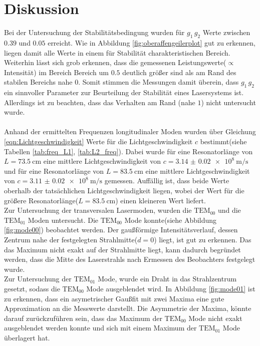 \section{Diskussion}
\label{sec:Diskussion}

Bei der Untersuchung der Stabilitätsbedingung wurden für $g_{1} \, g_{2}$
Werte zwischen $0.39$ und $0.05$ erreicht.
Wie in Abbildung \ref{fig:oberaffengeilerplot} gut zu erkennen, liegen damit alle Werte
in einem für Stabilität charakteristischen Bereich.
Weiterhin lässt sich grob erkennen, dass die gemessenen Leistungswerte($\propto$Intensität)
im Bereich Bereich um $0.5$ deutlich größer sind als am Rand des stabilen Bereichs nahe $0$.
Somit stimmen die Messungen damit überein, dass $g_{1} \, g_{2}$ ein sinnvoller Parameter zur
Beurteilung der Stabilität eines Lasersystems ist. Allerdings ist zu beachten, dass das Verhalten am
Rand (nahe $1$) nicht untersucht wurde.\\ \\


Anhand der ermittelten Frequenzen longitudinaler Moden wurden über Gleichung \eqref{eqn:Lichtgeschwindigkeit}
Werte für die Lichtgeschwindigkeit $c$ bestimmt(siehe Tabellen \ref{tab:freq_L1}, \ref{tab:L2_freq}).
Dabei wurde für eine Resonatorlänge von $L = \SI{73.5}{\centi\meter}$ eine mittlere
Lichtgeschwindigkeit von $ c = \SI{3.14(2) e8}{\meter\per\second}$
und für eine Resonatorlänge von $L = \SI{83.5}{\centi\meter}$ eine mittlere
Lichtgeschwindigkeit von $ c = \SI{3.11(2) e8}{\meter\per\second}$ gemessen.
Auffällig ist, dass beide Werte oberhalb der tatsächlichen Lichtgeschwindigkeit
liegen, wobei der Wert für die größere Resonatorlänge($L = \SI{83.5}{\centi\meter}$)
einen kleineren Wert liefert.\\
Zur Untersuchung der transversalen Lasermoden, wurden die \textbf{$\text{TEM}_{00}$}
und die \textbf{$\text{TEM}_{01}$} Moden untersucht.
Die \textbf{$\text{TEM}_{00}$} Mode konnte(siehe Abbildung \ref{fig:mode00})
beobachtet werden. Der gaußförmige Intensitätsverlauf, dessen Zentrum nahe der
festgelegten Strahlmitte($d = 0$) liegt, ist gut zu erkennen.
Das das Maximum nicht exakt auf der Strahlmitte liegt, kann dadurch begründet werden,
dass die Mitte des Laserstrahls nach Ermessen des Beobachters festgelegt wurde.\\
Zur Untersuchung der \textbf{$\text{TEM}_{01}$} Mode, wurde ein Draht in das
Strahlzentrum gesetzt, sodass die \textbf{$\text{TEM}_{00}$} Mode ausgeblendet wird.
In Abbildung \ref{fig:mode01} ist zu erkennen, dass ein asymetrischer Gaußfit mit zwei Maxima
eine gute Approximation an die Messwerte darstellt. Die Asymmetrie der Maxima, könnte darauf
zurückzuführen sein, dass das Maximum der \textbf{$\text{TEM}_{00}$} Mode nicht exakt
ausgeblendet werden konnte und sich mit einem Maximum der \textbf{$\text{TEM}_{01}$}
Mode überlagert hat.\\ \\



